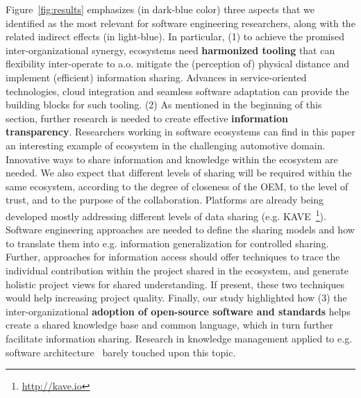 Figure~\ref{fig:results} emphasizes (in dark-blue color) three aspects that we identified as the most relevant for software engineering researchers, along with the related indirect effects (in light-blue).
In particular, (1) to achieve the promised inter-organizational synergy, ecosystems need {\bf harmonized tooling} that can flexibility inter-operate to a.o. mitigate the (perception of) physical distance and implement (efficient) information sharing. Advances in service-oriented technologies, cloud integration and seamless software adaptation can provide the building blocks for such tooling. (2) As mentioned in the beginning of this section, further research is needed to  create effective {\bf information transparency}. Researchers working in software ecosystems can find in this paper an interesting example of ecosystem in the challenging automotive domain. Innovative ways to share information and knowledge within the ecosystem are needed. %
We also expect that different levels of sharing will be required within the same ecosystem, according to the degree of closeness of the OEM, to the level of trust, and to the purpose of the collaboration. Platforms are already being developed mostly addressing different levels of data sharing (e.g. KAVE~\footnote{\url{http://kave.io}}). Software engineering approaches are needed to define the sharing models and how to translate them into e.g. information generalization for controlled sharing. Further, approaches for information access should offer techniques to trace the individual contribution within the project shared in the ecosystem, and generate holistic project views for shared understanding. If present, these two techniques would help increasing project quality. Finally, our study highlighted how (3) the inter-organizational {\bf adoption of open-source software and standards} helps create a shared knowledge base and common language, which in turn further facilitate information sharing. Research in knowledge management applied to e.g. software architecture~\cite{akmbook} barely touched upon this topic.

% 

